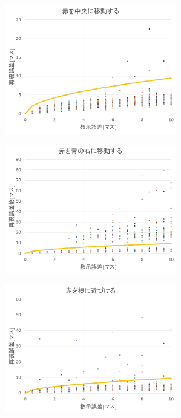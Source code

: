 \begin{figure}[h]
	\centering
	\begin{minipage}[t]{.49\textwidth}
		\centering
		\includegraphics[width=7.5cm]{スライド2.PNG} \\ %
		\label{subfigure:unit_a}    
	\end{minipage}
	\begin{minipage}[t]{.49\textwidth}
		\centering
		\includegraphics[width=7.5cm]{スライド3.PNG} \\ %
		\label{subfigure:unit_b}
	\end{minipage}
	\begin{minipage}[t]{.49\textwidth}
		\centering
		\includegraphics[width=7.5cm]{スライド4.PNG} \\ %

\end{minipage}
\end{figure}
